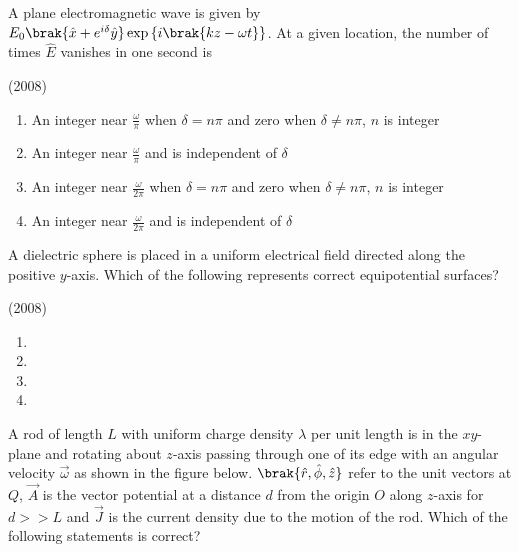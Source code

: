    \item A plane electromagnetic wave is given by $E_0\brak{\hat{x}+e^{i\delta} \hat{y}}\exp\left\{i\brak{kz-\omega t}\right\}$. At a given location, the number of times $\hat{E}$ vanishes in one second is
    
    \hfill{(2008)}


            \begin{enumerate}
                \item An integer near $\frac{\omega}{\pi}$ when $\delta=n\pi$ and zero when $\delta\neq n\pi$, $n$ is integer
                \item An integer near $\frac{\omega}{\pi}$ and is independent of $\delta$
                \item An integer near $\frac{\omega}{2\pi}$ when $\delta=n\pi$ and zero when $\delta\neq n\pi$, $n$ is integer
                \item An integer near $\frac{\omega}{2\pi}$ and is independent of $\delta$
            \end{enumerate}


    \item A dielectric sphere is placed in a uniform electrical field directed along the positive $y$-axis. Which of the following represents correct equipotential surfaces?
    
    \hfill{(2008)}

        \begin{multicols}{2}
            \begin{enumerate}
                \item 
                \item 
                \item 
                \item 
            \end{enumerate}
        \end{multicols}

    \item A rod of length $L$ with uniform charge density $\lambda$ per unit length is in the $xy$-plane and rotating about $z$-axis passing through one of its edge with an angular velocity $\overrightarrow{\omega}$ as shown in the figure below. $\brak{\hat{r}, \hat{\phi}, \hat{z}}$ refer to the unit vectors at $Q$, $\overrightarrow{A}$ is the vector potential at a distance $d$ from the origin $O$ along $z$-axis for $d>>L$ and $\overrightarrow{J}$ is the current density due to the motion of the rod. Which of the following statements is correct?
    
